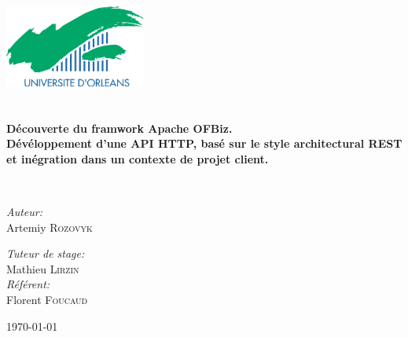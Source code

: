 \begin{titlepage}
\begin{center}

\includegraphics[width=0.35\textwidth]{./logo}~\\[1cm]


\textsc{\Large }\\[0.5cm]

\HRule \\[0.4cm]


{\huge \bfseries Découverte du framwork Apache OFBiz.\\
	Dévéloppement d'une API HTTP, basé sur le style architectural REST et inégration dans un contexte de projet client. \\[0.4cm] }

\HRule \\[1.5cm]


\begin{minipage}{0.4\textwidth}
\begin{flushleft} \large
\emph{Auteur:}\\
Artemiy \textsc{Rozovyk}\\
\thispagestyle{empty}
\end{flushleft}
\end{minipage}
\begin{minipage}{0.4\textwidth}
\thispagestyle{empty}
\begin{flushright} \large
\emph{Tuteur de stage:} \\
Mathieu \textsc{Lirzin}\\
\emph{Référent:} \\
Florent \textsc{Foucaud}
\end{flushright}
\end{minipage}

\vfill

{\large \today}

\end{center}
\end{titlepage}